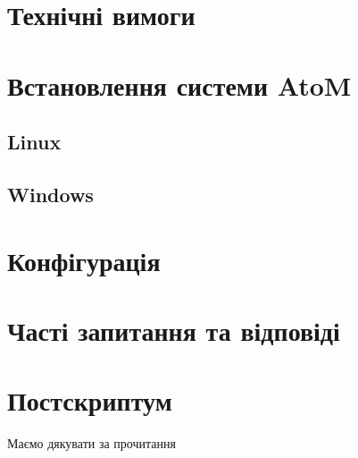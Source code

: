 \documentclass[14pt,a4paper]{article}
\begin{document}
\section{Технічні вимоги}

\section{Встановлення системи AtoM}
\subsection{Linux}
\subsection{Windows}

\section{Конфігурація}

\section{Часті запитання та відповіді}

\section{Постскриптум}
Маємо дякувати за прочитання
\end{document}
